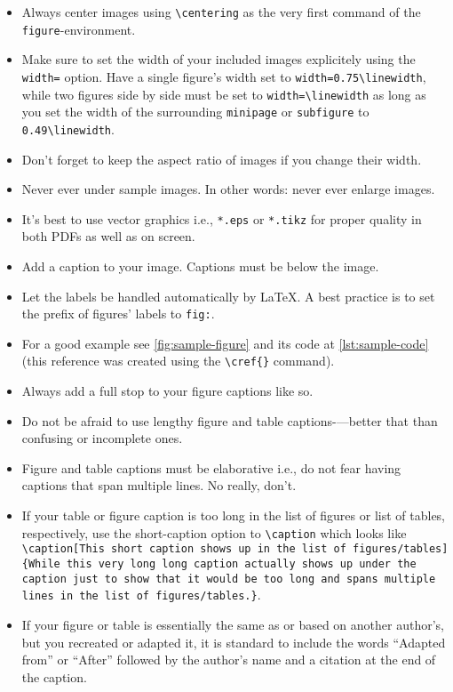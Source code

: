 \begin{itemize}
    \item Always center images using \lstinline!\centering! as the very first command of the \lstinline!figure!-environment.
    \item Make sure to set the width of your included images explicitely using the \lstinline!width=! option. Have a single figure's width set to \lstinline!width=0.75\linewidth!, while two figures side by side must be set to \lstinline!width=\linewidth! as long as you set the width of the surrounding \lstinline!minipage! or \lstinline!subfigure! to \lstinline!0.49\linewidth!.
    \item Don't forget to keep the aspect ratio of images if you change their width.
    \item Never ever under sample images. In other words: never ever enlarge images.
    \item It's best to use vector graphics i.e., \lstinline!*.eps! or \lstinline!*.tikz! for proper quality in both PDFs as well as on screen.
    \item Add a caption to your image. Captions must be below the image.
    \item Let the labels be handled automatically by \LaTeX. A best practice is to set the prefix of figures' labels to \lstinline!fig:!.
    \item For a good example see \cref{fig:sample-figure} and its code at \cref{lst:sample-code} (this reference was created using the \lstinline!\cref{}! command).
    \item Always add a full stop to your figure captions like so.
    \item Do not be afraid to use lengthy figure and table captions-—better that than confusing or incomplete ones.
    \item Figure and table captions must be elaborative i.e., do not fear having captions that span multiple lines. No really, don't.
    \item If your table or figure caption is too long in the list of figures or list of tables, respectively, use the short-caption option to \lstinline!\caption! which looks like \lstinline!\caption[This short caption shows up in the list of figures/tables]{While this very long long caption actually shows up under the caption just to show that it would be too long and spans multiple lines in the list of figures/tables.}!.
    \item If your figure or table is essentially the same as or based on another author’s, but you recreated or adapted it, it is standard to include the words ``Adapted from'' or ``After'' followed by the author’s name and a citation at the end of the caption.

\end{itemize}
